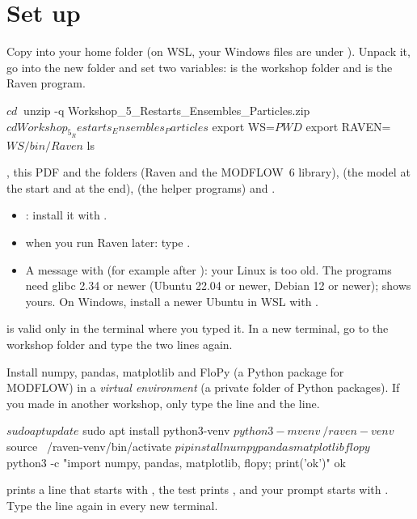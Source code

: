 \section{Set up}

\label{st:unpack}
Copy  into your home folder (on WSL, your Windows files are under
). Unpack it, go into the new folder and set two variables:  is the workshop folder and 
is the Raven program.
\begin{shell}
$ cd ~
$ unzip -q Workshop_5_Restarts_Ensembles_Particles.zip
$ cd Workshop_5_Restarts_Ensembles_Particles
$ export WS=$PWD
$ export RAVEN=$WS/bin/Raven
$ ls
\end{shell}
\see {}, this PDF and the folders  (Raven and the MODFLOW~6 library),  (the model at the
start and at the end),  (the helper programs) and .
\begin{trouble}
\begin{itemize}
\item {}: install it with .
\item {} when you run Raven later: type .
\item A message with  (for example after ): your Linux is too old. The programs need glibc 2.34 or newer (Ubuntu 22.04 or newer, Debian 12 or newer);  shows yours. On Windows, install a newer Ubuntu in WSL with .
\end{itemize}
\end{trouble}
\begin{note}
 is valid only in the terminal where you typed it. In a new terminal, go to the workshop folder and type the
two  lines again.
\end{note}

\label{st:python}
Install numpy, pandas, matplotlib and FloPy (a Python package for MODFLOW) in a \emph{virtual
environment} (a private folder of Python packages). If you made  in another workshop,
only type the  line and the  line.
\begin{shell}
$ sudo apt update
$ sudo apt install python3-venv
$ python3 -m venv ~/raven-venv
$ source ~/raven-venv/bin/activate
$ pip install numpy pandas matplotlib flopy
$ python3 -c "import numpy, pandas, matplotlib, flopy; print('ok')"
ok
\end{shell}
\see {} prints a line that starts with , the test prints , and your prompt starts
with . Type the  line again in every new terminal.
